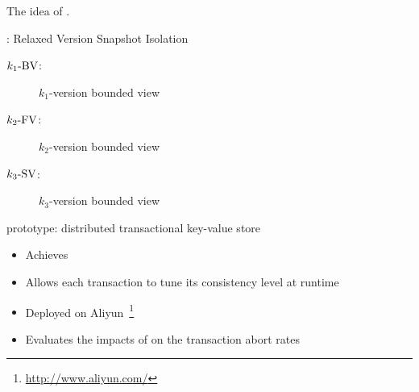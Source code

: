 \begin{frame}{}
  The idea of .

  \vspace{0.50cm}
  \rvsi{}: Relaxed Version Snapshot Isolation
  \begin{description}
    \item[$k_1\text{-BV}$:] $k_1$-version bounded \emph{} view
    \item[$k_2\text{-FV}$:] $k_2$-version bounded \emph{} view
    \item[$k_3\text{-SV}$:] $k_3$-version bounded \emph{} view
  \end{description}

  \pause
  \vspace{10pt}
  \chameleon{} prototype: distributed transactional key-value store
  \begin{itemize}
    \item Achieves \rvsi{}
    \item Allows each transaction to tune its consistency level at runtime
      \pause
    \item Deployed on Aliyun~\footnote{\url{http://www.aliyun.com/}}
    \item Evaluates the impacts of \rvsi{} on the transaction abort rates
  \end{itemize}
\end{frame}
